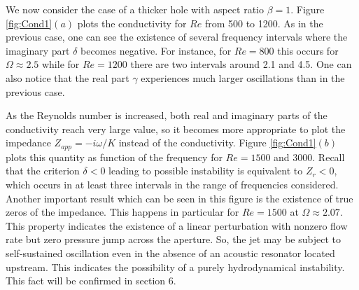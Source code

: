 \documentclass{jfm}
\begin{document}


We now consider the case of a thicker hole with aspect ratio $\beta = 1$. Figure \ref{fig:Cond1}$(a)$ plots the conductivity for $Re$ from 500 to 1200. As in the previous case, one can see the existence of several frequency intervals where the imaginary part $\delta$ becomes negative. For instance, for $Re = 800$ this occurs for $\Omega \approx 2.5$ while for $Re = 1200$ there are two intervals around 2.1 and 4.5. One can also notice that the real part $\gamma$ experiences much larger oscillations than in the previous case. 

As the Reynolds number is increased, both real and imaginary parts of the conductivity reach very large value, so it becomes more appropriate to plot the impedance $Z_{app} = -i \omega/K$ instead of the conductivity. Figure \ref{fig:Cond1}$(b)$ plots this quantity as function of the frequency for $Re = 1500$ and $3000$.
Recall that the criterion $\delta<0$ leading to possible instability is equivalent to $Z_r<0$, which occurs in at least three intervals in the range of frequencies considered. Another important result which can be seen in this figure is the existence of true zeros of the impedance. This happens in particular for $Re = 1500$ at $\Omega \approx 2.07$. This property indicates the existence of a linear perturbation with nonzero flow rate but zero pressure jump across the aperture. So, the jet may be subject to self-sustained oscillation even in the absence of an acoustic resonator located upstream. This indicates the possibility of a purely hydrodynamical instability. This fact will be confirmed in section 6.
\end{document}
